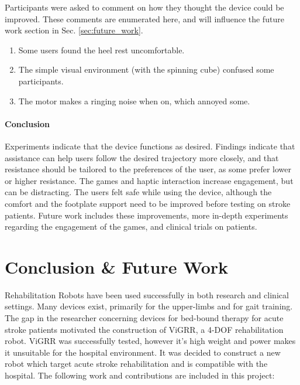 \documentclass[12pt]{report}
\begin{document}
Participants were asked to comment on how they thought the device could be improved. These comments are enumerated here, and will influence the future work section in Sec. \ref{sec:future_work}. 		
		
		\begin{enumerate}
			\item Some users found the heel rest uncomfortable. 
			\item The simple visual environment (with the spinning cube) confused some participants.
			\item The motor makes a ringing noise when on, which annoyed some.
		
		
		\end{enumerate}
		
\subsubsection{Conclusion}

 Experiments indicate that the device functions as desired. Findings indicate that assistance can help users follow the desired trajectory more closely, and that resistance should be tailored to the preferences of the user, as some prefer lower or higher resistance. The games and haptic interaction increase engagement, but can be distracting. The users felt safe while using the device, although the comfort and the footplate support need to be improved before testing on stroke patients. Future work includes these improvements, more in-depth experiments regarding the engagement of the games, and clinical trials on patients. 
	

\chapter{Conclusion \& Future Work} \label{ch_conc}

	Rehabilitation Robots have been used successfully in both research and clinical settings. Many devices exist, primarily for the upper-limbs and for gait training. The gap in the researcher concerning devices for bed-bound therapy for acute stroke patients motivated the construction of ViGRR, a 4-DOF rehabilitation robot. ViGRR was successfully tested, however it's high weight and power makes it unsuitable for the hospital environment. It was decided to construct a new robot which target acute stroke rehabilitation and is compatible with the hospital. The following work and contributions are included in this project: 
	
\end{document}
